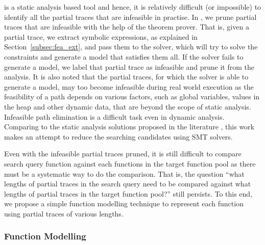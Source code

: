 \tool is a static analysis based tool and hence, it is relatively difficult (or impossible) to identify all the partial traces that are infeasible in practise. In \tool, we prune partial traces that are infeasible with the help of the theorem prover. That is, given a partial trace, we extract symbolic expressions, as explained in Section~\ref{subsec:fea_ext}, and pass them to the solver, which will try to solve the constraints and generate a model that satisfies them all. If the solver fails to generate a model, we label that partial trace as infeasible and prune it from the analysis. It is also noted that the partial traces, for which the solver is able to generate a model, may too become infeasible during real world execution as the feasibility of a path depends on various factors, such as global variables, values in the heap and other dynamic data, that are beyond the scope of static analysis.
Infeasible path elimination is a difficult task even in dynamic analysis. Comparing to the static analysis solutions proposed in the literature \cite{david2014tracelet,pewny2014leveraging,pewnycross}, this work makes an attempt to reduce the searching candidates using SMT solvers.


Even with the infeasible partial traces pruned, it is still difficult to compare search query function against each functions  in the target function pool as there must be a systematic way to do the comparison. That is, the question ``what lengths of partial traces in the search query need to be compared against what lengths of partial traces in the target function pool?'' still persists. To this end, we propose a simple function modelling technique to represent each function using partial traces of various lengths.

\subsubsection{Function Modelling} \label{subsubsec:fun_mod}

